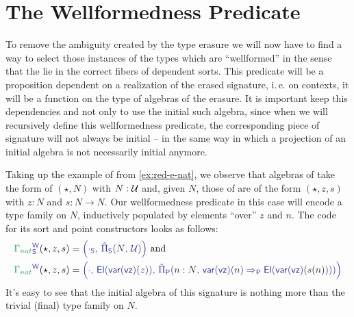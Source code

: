 \section{The Wellformedness Predicate}\label{sec:red-w}

To remove the ambiguity created by the type erasure we will now have to find
a way to select those instances of the types which are ``wellformed'' in the
sense that the lie in the correct fibers of dependent sorts.
This predicate will be a proposition dependent on a realization of the erased
signature, i.\,e. on contexts, it will be a function on the type of algebras
of the erasure.
It is important keep this dependencies and not only to use the initial such
algebra, since when we will recursively define this wellformedness predicate,
the corresponding piece of signature will not always be initial
-- in the same way in which a projection of an initial algebra is not necessarily
initial anymore.

\begin{example}\label{ex:red-w-nat}
Taking up the example of  from \ref{ex:red-e-nat},
we observe that algebras of  take the form of
$(\star, N)$ with $N : \mathcal{U}$ and, given $N$, those of
 are of the form $(\star, z, s)$ with
$z : N$ and $s : N \to N$.
Our wellformedness predicate in this case will encode a type family on $N$, inductively
populated by elements ``over'' $z$ and $n$.
The code for its sort and point constructors looks as follows:
\begin{align*}
\tqm{\grm{\Gamma_{nat}}^\WW_\Sc}(\star, z, s)
  &= \tqm{\left( \cdot_\Sc,\, \ExtPiS{N}{\UU} \right)} \text{ and} \\
\tqm{\grm{\Gamma_{nat}}^\WW}(\star, z, s)
  &= \tqm{\left( \cdot,\,  \El(\var(\vz)(\blm{z})),\,
    \ExtPiP{n : N}{\var(\vz)(\blm{n}) \Rightarrow_\Pc \El(\var(\vz)(\blm{s(n)}))} \right)}
\end{align*} %
It's easy to see that the initial algebra of this signature is nothing more than
the trivial (final) type family on $N$.
\end{example}

